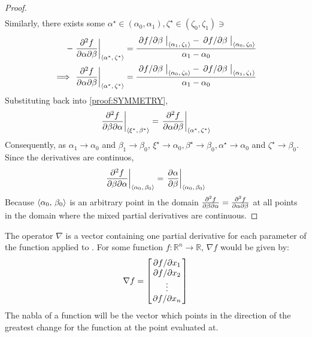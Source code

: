 \begin{lemma}
\begin{proof}
\begin{align*}
		\end{align*}
		Similarly, there exists some $\alpha^\star\in(\alpha_0,\alpha_1),\zeta^\star\in(\zeta_0,\zeta_1)\ni$
		\begin{align*}
			-\eval{\pdv{f}{\alpha}{\beta}}_{\point{\alpha^\star}{\zeta^\star}}&=\frac{\eval{\pdv*{f}{\beta}}_{\point{\alpha_1}{\zeta_1}}-\eval{\pdv*{f}{\beta}}_{\point{\alpha_0}{\zeta_0}}}{\alpha_1-\alpha_0}\\
			\implies\eval{\pdv{f}{\alpha}{\beta}}_{\point{\alpha^\star}{\zeta^\star}}&=\frac{\eval{\pdv*{f}{\beta}}_{\point{\alpha_0}{\zeta_0}}-\eval{\pdv*{f}{\beta}}_{\point{\alpha_1}{\zeta_1}}}{\alpha_1-\alpha_0}
		\end{align*}
		Substituting back into \eqref{proof:SYMMETRY},
		$$
			\eval{\pdv{f}{\beta}{\alpha}}_{\point{\xi^\star}{\beta^\star}}=\eval{\pdv{f}{\alpha}{\beta}}_{\point{\alpha^\star}{\zeta^\star}}
		$$
		Consequently, as $\alpha_1\rightarrow\alpha_0$ and $\beta_1\rightarrow\beta_0$, $\xi^\star\rightarrow\alpha_0,\beta^\star\rightarrow\beta_0,\alpha^\star\rightarrow\alpha_0$ 
		and $\zeta^\star\rightarrow\beta_0$. Since the derivatives are continuos,
		$$
			\eval{\pdv{f}{\beta}{\alpha}}_{\point{\alpha_0}{\beta_0}}=\eval{\pdv{\alpha}{\beta}}_{\point{\alpha_0}{\beta_0}}
		$$
		Because $\langle\alpha_0,\,\beta_0\rangle$ is an arbitrary point in the domain $\pdv{f}{\beta}{\alpha}=\pdv{f}{\alpha}{\beta}$ at 
		all points in the domain where the mixed partial derivatives are continuous.
	\end{proof}
\end{lemma}
\begin{defn}
	The  operator $\nabla$ is a vector containing one partial derivative for each parameter of
	the function applied to \cite{RAPP2017137}. For some function $f:\mathbb{R}^n\rightarrow\mathbb{R}$, $\nabla f$ would be given by:
	$$
	\nabla f=\begin{bmatrix}
		\pdv*{f}{x_1}\\
		\pdv*{f}{x_2}\\
		\vdots\\
		\pdv*{f}{x_n}
	\end{bmatrix}
	$$
	The nabla of a function will be the vector which points in the direction of the greatest change for the function
	at the point evaluated at.
\end{defn}

